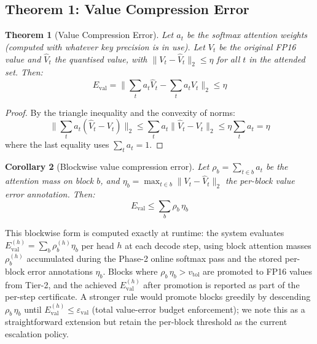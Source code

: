 \documentclass[10pt,twocolumn,a4paper]{article}
\newtheorem{theorem}{Theorem}[section]
\newtheorem{corollary}[theorem]{Corollary}
\theoremstyle{definition}
\theoremstyle{remark}
\newcommand{\norm}[1]{\lVert #1 \rVert}
\begin{document}
\subsection{Theorem 1: Value Compression Error}
\label{sec:val_error}

\begin{theorem}[Value Compression Error]
\label{thm:val}
Let $a_t$ be the softmax attention weights (computed with whatever key precision is in use).  Let $V_t$ be the original FP16 value and $\hat{V}_t$ the quantised value, with $\norm{V_t - \hat{V}_t}_2 \leq \eta$ for all $t$ in the attended set.  Then:
\begin{equation}
  E_{\mathrm{val}} = \norm{\sum_t a_t \hat{V}_t - \sum_t a_t V_t}_2 \leq \eta
\end{equation}
\end{theorem}

\begin{proof}
By the triangle inequality and the convexity of norms:
\[
  \norm{\sum_t a_t (\hat{V}_t - V_t)}_2 \leq \sum_t a_t \norm{\hat{V}_t - V_t}_2 \leq \eta \sum_t a_t = \eta
\]
where the last equality uses $\sum_t a_t = 1$.
\end{proof}

\begin{corollary}[Blockwise value compression error]
\label{cor:val_block}
Let $\rho_b = \sum_{t \in b} a_t$ be the attention mass on block $b$, and $\eta_b = \max_{t \in b} \norm{V_t - \hat{V}_t}_2$ the per-block value error annotation.  Then:
\begin{equation}
  E_{\mathrm{val}} \leq \sum_b \rho_b \,\eta_b
  \label{eq:val_block}
\end{equation}
\end{corollary}

This blockwise form is computed exactly at runtime: the system evaluates
$E_{\mathrm{val}}^{(h)} = \sum_b \rho_b^{(h)} \eta_b$ per head $h$ at each decode step, using block attention masses $\rho_b^{(h)}$ accumulated during the Phase-2 online softmax pass and the stored per-block error annotations $\eta_b$.  Blocks where $\rho_b \,\eta_b > v_{\mathrm{tol}}$ are promoted to FP16 values from Tier-2, and the achieved $E_{\mathrm{val}}^{(h)}$ after promotion is reported as part of the per-step certificate.  A stronger rule would promote blocks greedily by descending $\rho_b \,\eta_b$ until $E_{\mathrm{val}}^{(h)} \leq \varepsilon_{\mathrm{val}}$ (total value-error budget enforcement); we note this as a straightforward extension but retain the per-block threshold as the current escalation policy.
\end{document}
